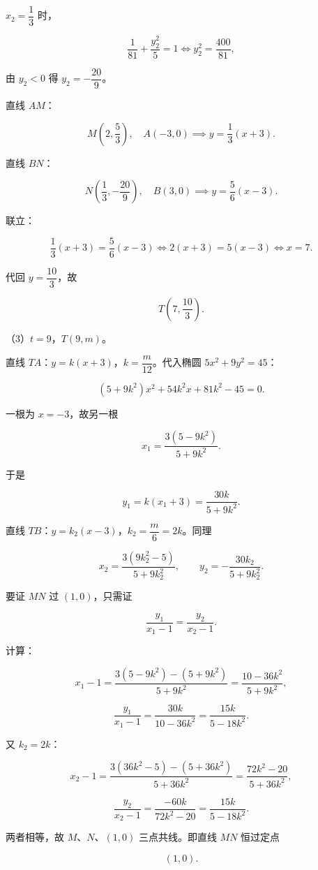 \begin{answer}
$x_2=\dfrac13$ 时，

\nopagebreak[4]
\[\frac1{81}+\frac{y_2^2}5=1\iff y_2^2=\frac{400}{81},\]

由 $y_2<0$ 得 $y_2=-\dfrac{20}9$。

直线 $AM$：

\nopagebreak[4]
\[M\left(2,\frac53\right),\quad A(-3,0)
\implies y=\frac13(x+3).\]

直线 $BN$：

\nopagebreak[4]
\[N\left(\frac13,-\frac{20}9\right),\quad B(3,0)
\implies y=\frac56(x-3).\]

联立：

\nopagebreak[4]
\[\frac13(x+3)=\frac56(x-3)
\iff 2(x+3)=5(x-3)
\iff x=7.\]

代回 $y=\dfrac{10}3$，故

\nopagebreak[4]
\[T\left(7,\frac{10}3\right).\]

（3）$t=9$，$T(9,m)$。

直线 $TA$：$y=k(x+3)$，$k=\dfrac m{12}$。代入椭圆 $5x^2+9y^2=45$：

\nopagebreak[4]
\[(5+9k^2)x^2+54k^2x+81k^2-45=0.\]

一根为 $x=-3$，故另一根

\nopagebreak[4]
\[x_1=\frac{3(5-9k^2)}{5+9k^2}.\]

于是

\nopagebreak[4]
\[y_1=k(x_1+3)=\frac{30k}{5+9k^2}.\]

直线 $TB$：$y=k_2(x-3)$，$k_2=\dfrac m6=2k$。同理

\nopagebreak[4]
\[x_2=\frac{3(9k_2^2-5)}{5+9k_2^2},\qquad
y_2=-\frac{30k_2}{5+9k_2^2}.\]

要证 $MN$ 过 $(1,0)$，只需证

\nopagebreak[4]
\[\frac{y_1}{x_1-1}=\frac{y_2}{x_2-1}.\]

计算：

\nopagebreak[4]
\[x_1-1=\frac{3(5-9k^2)-(5+9k^2)}{5+9k^2}
=\frac{10-36k^2}{5+9k^2},\]

\nopagebreak[4]
\[\frac{y_1}{x_1-1}
=\frac{30k}{10-36k^2}
=\frac{15k}{5-18k^2}.\]

又 $k_2=2k$：

\nopagebreak[4]
\[x_2-1=\frac{3(36k^2-5)-(5+36k^2)}{5+36k^2}
=\frac{72k^2-20}{5+36k^2},\]

\nopagebreak[4]
\[\frac{y_2}{x_2-1}
=\frac{-60k}{72k^2-20}
=\frac{15k}{5-18k^2}.\]

两者相等，故 $M$、$N$、$(1,0)$ 三点共线。即直线 $MN$ 恒过定点

\nopagebreak[4]
\[(1,0).\]


\end{answer}
